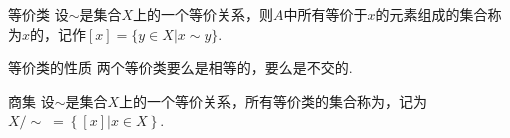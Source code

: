 \begin{definition}{等价类}
    设$\sim$是集合$X$上的一个等价关系，则$A$中所有等价于$x$的元素组成的集合称为$x$的，记作$[x]=\{y\in X|x\sim y\}$.
\end{definition}

\begin{proposition}{等价类的性质}
    两个等价类要么是相等的，要么是不交的.
\end{proposition}

\begin{definition}{商集}
    设$\sim$是集合$X$上的一个等价关系，所有等价类的集合称为，记为$X/\sim \;= \left\{[x]|x\in X\right\}$.
\end{definition}


